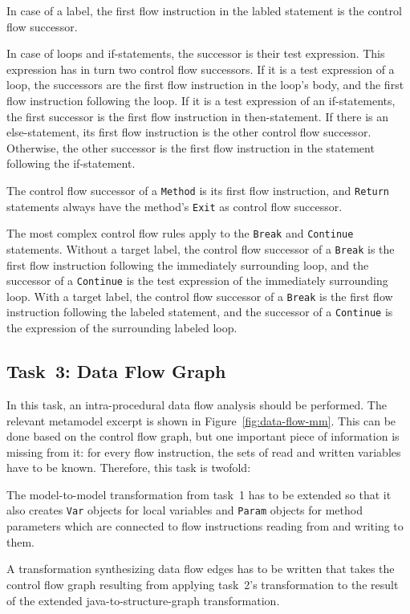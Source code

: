 \documentclass[submission]{eptcs}
\begin{document}
In case of a label, the first flow instruction in the labled statement is the
control flow successor.

In case of loops and if-statements, the successor is their test expression.
This expression has in turn two control flow successors.  If it is a test
expression of a loop, the successors are the first flow instruction in the
loop's body, and the first flow instruction following the loop.  If it is a
test expression of an if-statements, the first successor is the first flow
instruction in then-statement.  If there is an else-statement, its first flow
instruction is the other control flow successor.  Otherwise, the other
successor is the first flow instruction in the statement following the
if-statement.

The control flow successor of a \verb|Method| is its first flow instruction,
and \verb|Return| statements always have the method's \verb|Exit| as control
flow successor.

The most complex control flow rules apply to the \verb|Break| and
\verb|Continue| statements.  Without a target label, the control flow successor
of a \verb|Break| is the first flow instruction following the immediately
surrounding loop, and the successor of a \verb|Continue| is the test expression
of the immediately surrounding loop.  With a target label, the control flow
successor of a \verb|Break| is the first flow instruction following the labeled
statement, and the successor of a \verb|Continue| is the expression of the
surrounding labeled loop.


\subsection*{Task~3: Data Flow Graph}
\label{sec:task3-df-graph}

In this task, an intra-procedural data flow analysis should be performed.  The
relevant metamodel excerpt is shown in Figure~\ref{fig:data-flow-mm}.  This can
be done based on the control flow graph, but one important piece of information
is missing from it: for every flow instruction, the sets of read and written
variables have to be known.  Therefore, this task is twofold:

\begin{compactenum}
\item The model-to-model transformation from task~1 has to be extended so that
  it also creates \verb|Var| objects for local variables and \verb|Param|
  objects for method parameters which are connected to flow instructions
  reading from and writing to them.
\item A transformation synthesizing data flow edges has to be written that
  takes the control flow graph resulting from applying task~2's transformation
  to the result of the extended java-to-structure-graph transformation.
\end{compactenum}
\end{document}
